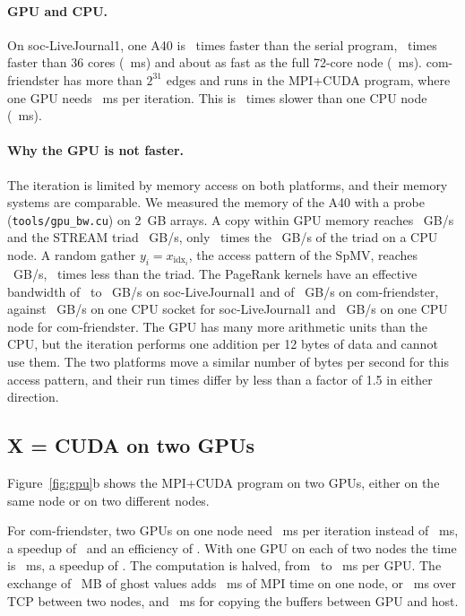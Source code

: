\documentclass[11pt,a4paper]{article}
\newcommand{\code}[1]{\texttt{#1}}
\begin{document}
\paragraph{GPU and CPU.} On soc-LiveJournal1, one A40 is \gpuVsSerial\ times faster than the serial program,
\gpuVsSocket\ times faster than 36 cores (~ms) and about as fast as the full 72-core node
(~ms). com-friendster has more than $2^{31}$ edges and runs in the MPI+CUDA program, where one GPU needs
\mgFRone~ms per iteration. This is \gpuFRvsNode\ times slower than one CPU node (~ms).

\paragraph{Why the GPU is not faster.} The iteration is limited by memory access on both platforms, and their
memory systems are comparable. We measured the memory of the A40 with a probe (\code{tools/gpu\_bw.cu}) on 2~GB
arrays. A copy within GPU memory reaches \gpuCopy~GB/s and the STREAM triad \gpuTriad~GB/s, only \gpuVsCpuTriad\ times the
\streamFull~GB/s of the triad on a CPU node. A random gather $y_i=x_{\mathrm{idx}_i}$, the access pattern of the
SpMV, reaches \gpuGather~GB/s, \gpuGatherRatio\ times less than the triad. The PageRank kernels have an effective
bandwidth of \gpuThrbw\ to \gpuMHybbw~GB/s on soc-LiveJournal1 and of \gpuFRbw~GB/s on com-friendster, against
~GB/s on one CPU socket for soc-LiveJournal1 and ~GB/s on one CPU node for com-friendster.
The GPU has many more arithmetic units than the CPU, but the iteration performs one addition per 12 bytes of
data and cannot use them. The two platforms move a similar number of bytes per second for this access pattern, and
their run times differ by less than a factor of 1.5 in either direction.

\subsection{X = CUDA on two GPUs}

Figure~\ref{fig:gpu}b shows the MPI+CUDA program on two GPUs, either on the same node or on two different nodes.

For com-friendster, two GPUs on one node need \mgFRtwo~ms per iteration instead of \mgFRone~ms, a speedup of
\mgFRS\ and an efficiency of \mgFRE. With one GPU on each of two nodes the time is \mgFRxn~ms, a speedup of \mgFRSx.
The computation is halved, from \mgFRone\ to \mgFRtwocomp~ms per GPU. The exchange of \mgFRvol~MB of ghost values
adds \mgFRtwocomm~ms of MPI time on one node, or \mgFRxncomm~ms over TCP between two nodes, and \mgFRtwostage~ms for
copying the buffers between GPU and host.
\end{document}
